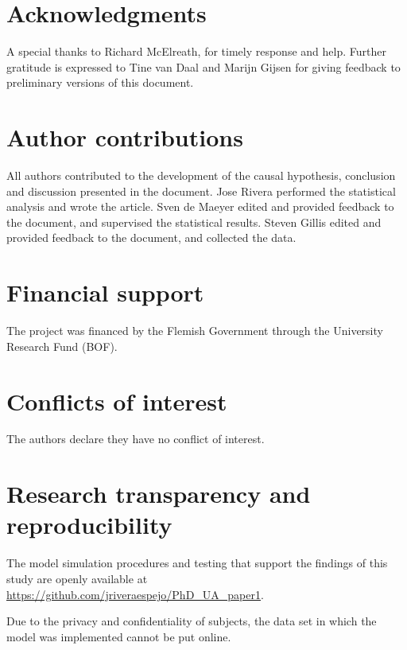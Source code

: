 \section{Acknowledgments}
%
A special thanks to Richard McElreath, for timely response and help. Further gratitude is expressed to Tine van Daal and Marijn Gijsen for giving feedback to preliminary versions of this document.
%
%
\section{Author contributions}
%
All authors contributed to the development of the causal hypothesis, conclusion and discussion presented in the document. Jose Rivera performed the statistical analysis and wrote the article. Sven de Maeyer edited and provided feedback to the document, and supervised the statistical results. Steven Gillis edited and provided feedback to the document, and collected the data.
%
%
\section{Financial support}
%
The project was financed by the Flemish Government through the University Research Fund (BOF).
%
%
\section{Conflicts of interest}
The authors declare they have no conflict of interest.
%
%
\section{Research transparency and reproducibility}
The model simulation procedures and testing that support the findings of this study are openly available at \url{https://github.com/jriveraespejo/PhD_UA_paper1}.

Due to the privacy and confidentiality of subjects, the data set in which the model was implemented cannot be put online.
%
%